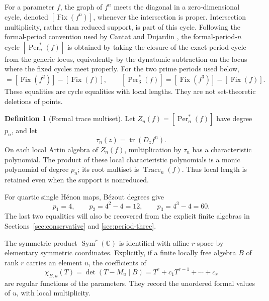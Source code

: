 \documentclass[11pt]{article}
\theoremstyle{definition}
\newtheorem{definition}[theorem]{Definition}
\newcommand{\C}{\mathbb C}
\newcommand{\tr}{\operatorname{tr}}
\newcommand{\Fix}{\operatorname{Fix}}
\newcommand{\Per}{\operatorname{Per}}
\newcommand{\Trace}{\operatorname{Trace}}
\newcommand{\Sym}{\operatorname{Sym}}
\begin{document}
For a parameter $f$, the graph of $f^n$ meets the diagonal in a zero-dimensional cycle, denoted $[\Fix(f^n)]$, whenever the intersection is proper. Intersection multiplicity, rather than reduced support, is part of this cycle. Following the formal-period convention used by Cantat and Dujardin \cite{CantatDujardin2026}, the formal-period-$n$ cycle $[\Per_n^*(f)]$ is obtained by taking the closure of the exact-period cycle from the generic locus, equivalently by the dynatomic subtraction on the locus where the fixed cycles meet properly. For the two prime periods used below,
\begin{equation}
[\Per_2^*(f)]=[\Fix(f^2)]-[\Fix(f)],
\qquad
[\Per_3^*(f)]=[\Fix(f^3)]-[\Fix(f)].
\label{eq:formal-prime-subtraction}
\end{equation}
These equalities are cycle equalities with local lengths. They are not set-theoretic deletions of points.

\begin{definition}[Formal trace multiset]
\label{def:formal-trace}
Let $Z_n(f)=[\Per_n^*(f)]$ have degree $p_n$, and let
\[
\tau_n(z)=\tr(D_zf^n).
\]
On each local Artin algebra of $Z_n(f)$, multiplication by $\tau_n$ has a characteristic polynomial. The product of these local characteristic polynomials is a monic polynomial of degree $p_n$; its root multiset is $\Trace_n(f)$. Thus local length is retained even when the support is nonreduced.
\end{definition}

For quartic single H\'enon maps, B\'ezout degrees give
\begin{equation}
p_1=4,
\qquad
p_2=4^2-4=12,
\qquad
p_3=4^3-4=60.
\label{eq:formal-degrees}
\end{equation}
The last two equalities will also be recovered from the explicit finite algebras in Sections~\ref{sec:conservative} and \ref{sec:period-three}.

The symmetric product $\Sym^r(\C)$ is identified with affine $r$-space by elementary symmetric coordinates. Explicitly, if a finite locally free algebra $B$ of rank $r$ carries an element $u$, the coefficients of
\begin{equation}
\chi_{B,u}(T)=\det(T-M_u\mid B)
=T^r+c_1T^{r-1}+\cdots+c_r
\label{eq:characteristic-symmetric}
\end{equation}
are regular functions of the parameters. They record the unordered formal values of $u$, with local multiplicity.
\end{document}
